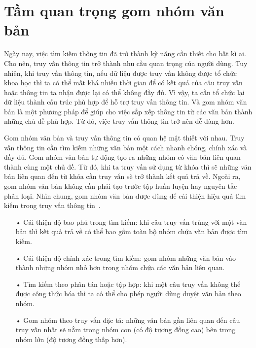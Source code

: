 \section{Tầm quan trọng gom nhóm văn bản}
Ngày nay, việc tìm kiếm thông tin đã trở thành kỹ năng cần thiết cho bất kì ai.
Cho nên, truy vấn thông tin trở thành nhu cầu quan trọng của người dùng.
Tuy nhiên, khi truy vấn thông tin, nếu dữ liệu được truy vấn không được tổ chức khoa học thì ta có thể mất khá nhiều thời gian để có kết quả của câu truy vấn hoặc thông tin ta nhận được lại có thể không đầy đủ.
Vì vậy, ta cần tổ chức lại dữ liệu thành cấu trúc phù hợp để hỗ trợ truy vấn thông tin.
Và gom nhóm văn bản là một phương pháp để giúp cho việc sắp xếp thông tin từ các văn bản thành những chủ đề phù hợp.
Từ đó, việc truy vấn thông tin trở nên dễ dàng hơn.

Gom nhóm văn bản và truy vấn thông tin có quan hệ mật thiết với nhau.
Truy vấn thông tin cần tìm kiếm những văn bản một cách nhanh chóng, chính xác và đầy đủ.
Gom nhóm văn bản tự động tạo ra những nhóm có văn bản liên quan thành cùng một chủ đề.
Từ đó, khi ta truy vấn sử dụng từ khóa thì sẽ những văn bản liên quan đến từ khóa cần truy vấn sẽ trở thành kết quả trả về.
Ngoài ra, gom nhóm văn bản không cần phải tạo trước tập huấn luyện hay nguyên tắc phân loại.
Nhìn chung, gom nhóm văn bản được dùng để cải thiện hiệu quả tìm kiếm trong truy vấn thông tin~\cite{text-clustering}.
\begin{enumerate}
\item[•]Cải thiện độ bao phủ trong tìm kiếm: khi câu truy vấn trùng với một văn bản thì kết quả trả về có thể bao gồm toàn bộ nhóm chứa văn bản được tìm kiếm.
\item[•]Cải thiện độ chính xác trong tìm kiếm: gom nhóm những văn bản vào thành những nhóm nhỏ hơn trong nhóm chứa các văn bản liên quan.
\item[•]Tìm kiếm theo phân tán hoặc tập hợp: khi một câu truy vấn không thể được công thức hóa thì ta có thể cho phép người dùng duyệt văn bản theo nhóm.
\item[•]Gom nhóm theo truy vấn đặc tả: những văn bản gần liên quan đến câu truy vấn nhất sẽ nằm trong nhóm con (có độ tương đồng cao) bên trong nhóm lớn (độ tương đồng thấp hơn).
\end{enumerate}

